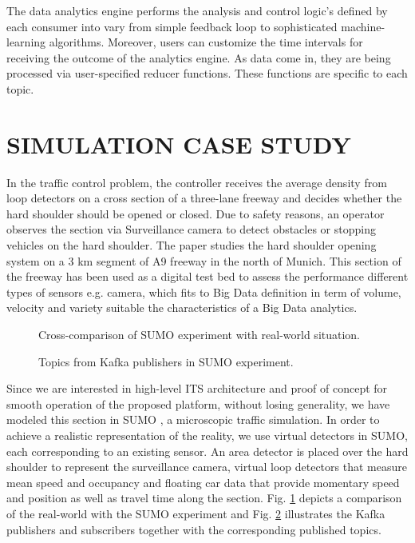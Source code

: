 \documentclass[sigconf]{acmart}
\begin{document}
The data analytics engine performs the analysis and control logic's defined by each consumer into vary from simple feedback loop to sophisticated machine-learning algorithms. Moreover, users can customize the time intervals for receiving the outcome of the analytics engine. As data come in, they are being processed via user-specified reducer functions. These functions are specific to each topic.

\section{SIMULATION CASE STUDY}

In the traffic control problem, the controller receives the average density from loop detectors on a cross section of a three-lane freeway and decides whether the hard shoulder should be opened or closed. Due to safety reasons, an operator observes the section via Surveillance camera to detect obstacles or stopping vehicles on the hard shoulder. The paper studies the hard shoulder opening system on a 3 km segment of A9 freeway in the north of Munich. This section of the freeway has been used as a digital test bed to assess the performance different types of sensors e.g. camera, which fits to Big Data definition in term of volume, velocity and variety suitable the characteristics of a Big Data analytics. 
\begin{figure}[h]
\centering
{}
\caption{Cross-comparison of SUMO experiment with real-world situation.}
\label{fig:2}
\end{figure}


\begin{figure}[htbp]
\centering
{}
\caption{Topics from Kafka publishers in SUMO experiment.}
\label{fig:3}
\end{figure}

Since we are interested in high-level ITS architecture and proof of concept for smooth operation of the proposed platform, without losing generality, we have modeled this section in SUMO \cite{sumo}, a microscopic traffic simulation. In order to achieve a realistic representation of the reality, we use virtual detectors in SUMO, each corresponding to an existing sensor. An area detector is placed over the hard shoulder to represent the surveillance camera, virtual loop detectors that measure mean speed and occupancy and floating car data that provide momentary speed and position as well as travel time along the section. Fig. \ref{fig:2} depicts a comparison of the real-world with the SUMO experiment and Fig. \ref{fig:3} illustrates the Kafka publishers and subscribers together with the corresponding published topics.
\end{document}
